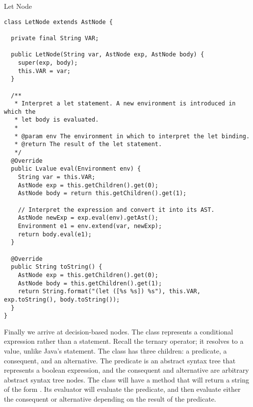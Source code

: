\begin{cl}{Let Node}
\begin{lstlisting}[language=MyJava]
class LetNode extends AstNode {

  private final String VAR;

  public LetNode(String var, AstNode exp, AstNode body) {
    super(exp, body);
    this.VAR = var;
  }

  /**
   * Interpret a let statement. A new environment is introduced in which the
   * let body is evaluated.
   *
   * @param env The environment in which to interpret the let binding.
   * @return The result of the let statement.
   */
  @Override
  public Lvalue eval(Environment env) {
    String var = this.VAR;
    AstNode exp = this.getChildren().get(0);
    AstNode body = return this.getChildren().get(1);

    // Interpret the expression and convert it into its AST.
    AstNode newExp = exp.eval(env).getAst();
    Environment e1 = env.extend(var, newExp);
    return body.eval(e1);
  }

  @Override
  public String toString() {
    AstNode exp = this.getChildren().get(0);
    AstNode body = this.getChildren().get(1);
    return String.format("(let ([%s %s]) %s"), this.VAR, exp.toString(), body.toString());
  }
}
\end{lstlisting}
\end{cl}

Finally we arrive at decision-based nodes. The  class represents a conditional expression rather than a statement. Recall the ternary operator; it resolves to a value, unlike Java's  statement. The  class has three children: a predicate, a consequent, and an alternative. The predicate is an abstract syntax tree that represents a boolean expression, and the consequent and alternative are arbitrary abstract syntax tree nodes. The  class will have a  method that will return a string of the form . Its evaluator will evaluate the predicate, and then evaluate either the consequent or alternative depending on the result of the predicate.

